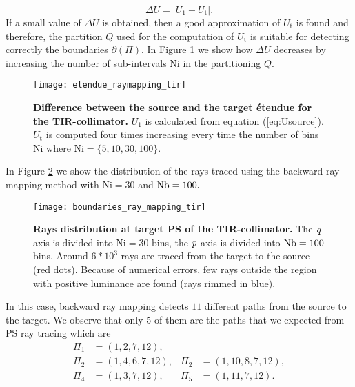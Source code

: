 \begin{equation}\label{eq:delta_raymapping}
\Delta U =  \big|U_1-U_{\textrm{t}}\big|.
\end{equation}
If a small value of $\Delta U$ is obtained, then a good approximation of $U_{\textrm{t}}$ is found and therefore, the partition $Q$ used for the computation of $U_{\textrm{t}}$ is suitable for detecting correctly the boundaries $\partial$$(\Pi)$. In Figure \ref{fig:etendue_raymapping_tir} we show how $\Delta U$ decreases by increasing the number of sub-intervals $\textrm{Ni}$ in the partitioning $Q$.  
\begin{figure}[h]
  \begin{center}
  \texttt{[image: etendue\_raymapping\_tir]}
  \end{center}
  \caption{\textbf{Difference between the source and the target \'{e}tendue for the TIR-collimator.}
 $U_1$ is calculated from equation (\ref{eq:Usource}). $U_{\textrm{t}}$ is computed four times increasing every time the number of bins $\textrm{Ni}$ where $\textrm{Ni}=\{5,10,30,100\}$. }
\label{fig:etendue_raymapping_tir}
 \end{figure}
In Figure \ref{fig:boundaries_TIR_ray_mapping} we show the distribution of the rays traced using the backward ray mapping method with $\textrm{Ni}=30$ and $\textrm{Nb} = 100.$ 
\begin{figure}[h]
  \begin{center}
  \texttt{[image: boundaries\_ray\_mapping\_tir]}
  \end{center}
  \caption{\textbf{Rays distribution at target PS of the TIR-collimator.}
 The $\textit{q}$-axis is divided into $\textrm{Ni}=30$ bins, the $\textit{p}$-axis is divided into $\textrm{Nb} = 100$ bins. Around $6*10^3$ rays are traced from the target to the source (red dots). Because of numerical errors, few rays outside the region with positive luminance are found (rays rimmed in blue).}
\label{fig:boundaries_TIR_ray_mapping}
 \end{figure}
In this case, backward ray mapping detects $11$ different paths from the source to the target. 
We observe that only $5$ of them are the paths that we expected from PS ray tracing which are
\begin{equation}\label{eq:paths_tir}
\begin{array}{llll}
\Pi_1&=(1,2,7,12), \\
\Pi_2&=(1,4,6,7,12), & \Pi_2&=(1,10,8,7,12),\\
\Pi_4&=(1,3,7,12), & \Pi_5&=(1,11,7,12).
\end{array}\end{equation}
